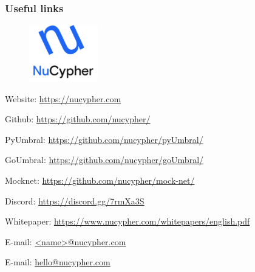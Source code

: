 \documentclass[xetex,mathsans,sans,aspectratio=169]{beamer}
\begin{document}
    \begin{frame}
        \frametitle{Useful links}
        \begin{figure}
            \centering
            \includegraphics[width=3cm]{pdf/nucypher_logo.pdf}
        \end{figure}
        Website: \url{https://nucypher.com}

        Github: \url{https://github.com/nucypher/}

        PyUmbral: \url{https://github.com/nucypher/pyUmbral/}

        GoUmbral: \url{https://github.com/nucypher/goUmbral/}

        Mocknet: \url{https://github.com/nucypher/mock-net/}

        Discord: \url{https://discord.gg/7rmXa3S}

        Whitepaper: \url{https://www.nucypher.com/whitepapers/english.pdf}

        E-mail: \url{<name>@nucypher.com}

        E-mail: \url{hello@nucypher.com}
    \end{frame}
\end{document}
